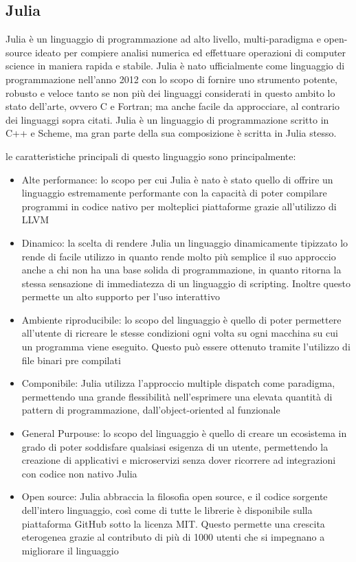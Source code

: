 \subsection{Julia}
Julia è un linguaggio di programmazione ad alto livello, 
multi-paradigma e open-source ideato per compiere analisi 
numerica ed effettuare operazioni di computer science in 
maniera rapida e stabile. Julia è nato ufficialmente come 
linguaggio di programmazione nell’anno 2012 con lo scopo di 
fornire uno strumento potente, robusto e veloce tanto se non 
più dei linguaggi considerati in questo ambito lo stato 
dell’arte, ovvero C e Fortran;  ma anche facile da approcciare, 
al contrario dei linguaggi sopra citati. Julia è un linguaggio 
di programmazione scritto in C++ e Scheme, ma gran parte della 
sua composizione è scritta in Julia stesso.

le caratteristiche principali di questo linguaggio sono 
principalmente:
\begin{itemize}
    \item Alte performance: lo scopo per cui Julia è nato è 
    stato quello di offrire un linguaggio estremamente 
    performante con la capacità di poter compilare programmi 
    in codice nativo per molteplici piattaforme grazie 
    all’utilizzo di LLVM

    \item Dinamico: la scelta di rendere Julia un linguaggio 
    dinamicamente tipizzato lo rende di facile utilizzo in 
    quanto rende molto più semplice il suo approccio anche a 
    chi non ha una base solida di programmazione, in quanto 
    ritorna la stessa sensazione di immediatezza di un 
    linguaggio di scripting. Inoltre questo permette un alto 
    supporto per l’uso interattivo

    \item Ambiente riproducibile: lo scopo del linguaggio è 
    quello di poter permettere all’utente di ricreare le 
    stesse condizioni ogni volta su ogni macchina su cui un 
    programma viene eseguito. Questo può essere ottenuto 
    tramite l’utilizzo di file binari pre compilati
    \item Componibile: Julia utilizza l’approccio multiple 
    dispatch come paradigma, permettendo una grande 
    flessibilità nell’esprimere una elevata quantità di 
    pattern di programmazione, dall’object-oriented al 
    funzionale
    \item General Purpouse: lo scopo del linguaggio è quello 
    di creare un ecosistema in grado di poter soddisfare 
    qualsiasi esigenza di un utente, permettendo la creazione 
    di applicativi e microservizi senza dover ricorrere ad 
    integrazioni con codice non nativo Julia
    \item Open source: Julia abbraccia la filosofia open source, 
    e il codice sorgente dell’intero linguaggio, così come di 
    tutte le librerie è disponibile sulla piattaforma GitHub 
    sotto la licenza MIT. Questo permette una crescita 
    eterogenea grazie al contributo di più di 1000 utenti 
    che si impegnano a migliorare il linguaggio
\end{itemize}


